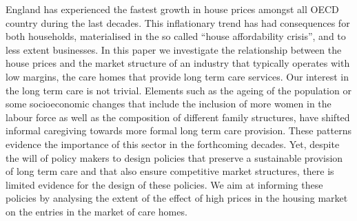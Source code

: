\documentclass[12pt,letterpaper]{article}
\begin{document}
England has experienced the fastest growth in house prices amongst all OECD country during the last decades.
This inflationary trend has had consequences for both households, materialised in the so called “house affordability crisis”, 
and to less extent businesses. In this paper we investigate the relationship between the house prices 
and the market structure of an industry that typically operates with low margins, the care homes 
that provide long term care services. Our interest in the long term care is not trivial. Elements such as 
the ageing of the population or some socioeconomic changes that include the inclusion of more women 
in the labour force as well as the composition of different family structures, have shifted informal caregiving 
towards more formal long term care provision. These patterns evidence the importance of this sector in the 
forthcoming decades. Yet, despite the will of policy makers to design policies that preserve a sustainable 
provision of long term care and that also ensure competitive market structures, there is limited evidence for
 the design of these policies.  We aim at informing these policies by analysing the extent of the effect of high 
 prices in the housing market on the entries in the market of care homes. 
 
\end{document}
